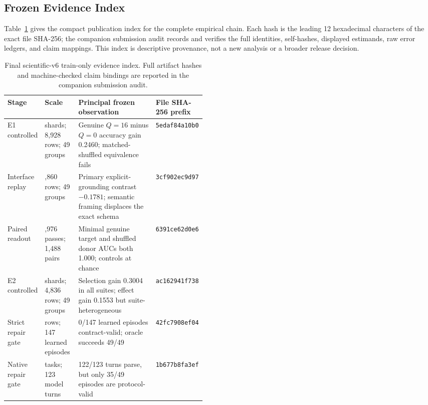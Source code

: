 \documentclass[10pt]{article}
\begin{document}
\subsection{Frozen Evidence Index}

Table~\ref{tab:evidenceindex} gives the compact publication index for the complete empirical chain. Each hash is the leading 12 hexadecimal characters of the exact file SHA-256; the companion submission audit records and verifies the full identities, self-hashes, displayed estimands, raw error ledgers, and claim mappings. This index is descriptive provenance, not a new analysis or a broader release decision.

\begin{table}[htbp]
\centering
\scriptsize
\begin{tabularx}{\linewidth}{@{}>{\raggedright\arraybackslash}p{0.15\linewidth}>{\raggedright\arraybackslash}p{0.17\linewidth}X>{\raggedright\arraybackslash}p{0.14\linewidth}@{}}
\toprule
\textbf{Stage} & \textbf{Scale} & \textbf{Principal frozen observation} & \textbf{File SHA-256 prefix} \\
\midrule
E1 controlled & 288 shards; 8,928 rows; 49 groups & Genuine $Q=16$ minus $Q=0$ accuracy gain 0.2460; matched-shuffled equivalence fails & \texttt{5edaf84a10b0} \\
Interface replay & 1,860 rows; 49 groups & Primary explicit-grounding contrast $-0.1781$; semantic framing displaces the exact schema & \texttt{3cf902ec9d97} \\
Paired readout & 2,976 passes; 1,488 pairs & Minimal genuine target and shuffled donor AUCs both 1.000; controls at chance & \texttt{6391ce62d0e6} \\
E2 controlled & 104 shards; 4,836 rows; 49 groups & Selection gain 0.3004 in all suites; effect gain 0.1553 but suite-heterogeneous & \texttt{ac162941f738} \\
Strict repair gate & 245 rows; 147 learned episodes & 0/147 learned episodes contract-valid; oracle succeeds 49/49 & \texttt{42fc7908ef04} \\
Native repair gate & 49 tasks; 123 model turns & 122/123 turns parse, but only 35/49 episodes are protocol-valid & \texttt{1b677b8fa3ef} \\
\bottomrule
\end{tabularx}
\caption{Final scientific-v6 train-only evidence index. Full artifact hashes and machine-checked claim bindings are reported in the companion submission audit.}
\label{tab:evidenceindex}
\end{table}
\FloatBarrier
\end{document}
